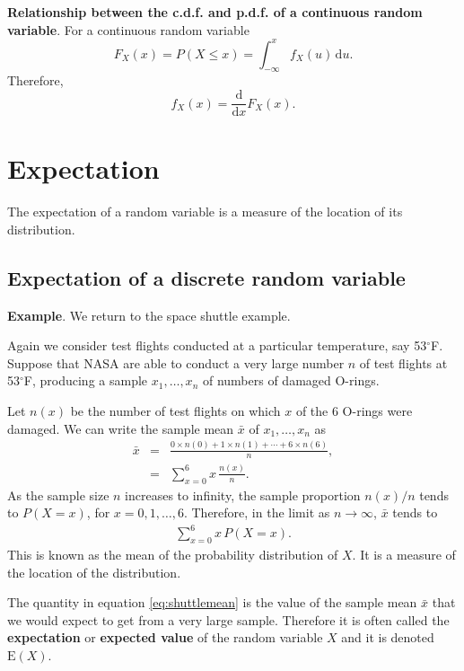 \documentclass[
  british,
  11pt,
  openany, a4paper]{book}
\begin{document}
\textbf{Relationship between the c.d.f. and p.d.f. of a continuous random variable}. For a continuous random variable
\[ F_X(x) = P(X \leq x) = \int_{-\infty}^x f_X(u) \,\mathrm{d}u. \]
Therefore,
\[ f_X(x) = \frac{\mathrm{d}}{\mathrm{d}x} F_X(x). \]

\section{Expectation}\label{expectation}

The expectation of a random variable is a measure of the location of its distribution.

\subsection{Expectation of a discrete random variable}\label{expectation-of-a-discrete-random-variable}

\textbf{Example}. We return to the space shuttle example.

Again we consider test flights conducted at a particular temperature, say 53\(^\circ\)F. Suppose that NASA are able to conduct a very large number \(n\) of test flights at 53\(^\circ\)F, producing a sample \(x_1,\ldots,x_n\) of numbers of damaged O-rings.

Let \(n(x)\) be the number of test flights on which \(x\) of the 6 O-rings were damaged. We can write the sample mean \(\bar{x}\) of \(x_1,\ldots,x_n\) as
\begin{eqnarray*}
\bar{x} &=& \frac{0 \times n(0) + 1 \times n(1) + \cdots + 6 \times n(6)}{n}, \\
&=& \sum_{x=0}^6 x\,\frac{n(x)}{n}.
\end{eqnarray*}
As the sample size \(n\) increases to infinity, the sample proportion \(n(x)/n\) tends to \(P(X=x)\), for \(x=0,1,\ldots,6\). Therefore, in the limit as \(n \rightarrow \infty\), \(\bar{x}\) tends to
\begin{eqnarray}
\sum_{x=0}^6 x\,P(X=x). 
\label{eq:shuttlemean}
\end{eqnarray}
This is known as the mean of the probability distribution of \(X\). It is a measure of the location of the distribution.

The quantity in equation \eqref{eq:shuttlemean} is the value of the sample mean \(\bar{x}\) that we would expect to get from a very large sample. Therefore it is often called the \textbf{expectation} or \textbf{expected value} of the random variable \(X\) and it is denoted \(\mathrm{E}(X)\).
\end{document}
